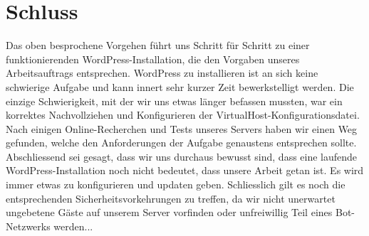 \documentclass{article}
\begin{document}
	\section{Schluss}
	Das oben besprochene Vorgehen führt uns Schritt für Schritt zu einer funktionierenden WordPress-Installation, die den Vorgaben unseres Arbeitsauftrags entsprechen.
	\newline
	\newline
	WordPress zu installieren ist an sich keine schwierige Aufgabe und kann innert sehr kurzer Zeit bewerkstelligt werden. Die einzige Schwierigkeit, mit der wir uns etwas länger befassen mussten, war ein korrektes Nachvollziehen und Konfigurieren der VirtualHost-Konfigurationsdatei. Nach einigen Online-Recherchen und Tests unseres Servers haben wir einen Weg gefunden, welche den Anforderungen der Aufgabe genaustens entsprechen sollte.
	\newline
	\newline
	Abschliessend sei gesagt, dass wir uns durchaus bewusst sind, dass eine laufende WordPress-Installation noch nicht bedeutet, dass unsere Arbeit getan ist. Es wird immer etwas zu konfigurieren und updaten geben. Schliesslich gilt es noch die entsprechenden Sicherheitsvorkehrungen zu treffen, da wir nicht unerwartet ungebetene Gäste auf unserem Server vorfinden oder unfreiwillig Teil eines Bot-Netzwerks werden...
\end{document}
